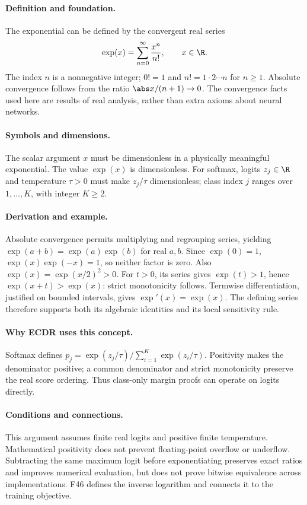 \paragraph{Definition and foundation.}
The exponential can be defined by the convergent real series
\[
 \exp(x)=\sum_{n=0}^{\infty}\frac{x^n}{n!},\qquad x\in\R.
\]
The index $n$ is a nonnegative integer; $0!=1$ and $n!=1\cdot2\cdots n$ for $n\ge1$. Absolute convergence follows from the ratio $\abs x/(n+1)\to0$. The convergence facts used here are results of real analysis, rather than extra axioms about neural networks.
\paragraph{Symbols and dimensions.}
The scalar argument $x$ must be dimensionless in a physically meaningful exponential. The value $\exp(x)$ is dimensionless. For softmax, logits $z_j\in\R$ and temperature $\tau>0$ must make $z_j/\tau$ dimensionless; class index $j$ ranges over $1,\ldots,K$, with integer $K\ge2$.
\paragraph{Derivation and example.}
Absolute convergence permits multiplying and regrouping series, yielding $\exp(a+b)=\exp(a)\exp(b)$ for real $a,b$. Since $\exp(0)=1$, $\exp(x)\exp(-x)=1$, so neither factor is zero. Also $\exp(x)=\exp(x/2)^2>0$. For $t>0$, its series gives $\exp(t)>1$, hence $\exp(x+t)>\exp(x)$: strict monotonicity follows. Termwise differentiation, justified on bounded intervals, gives $\exp'(x)=\exp(x)$. The defining series therefore supports both its algebraic identities and its local sensitivity rule.
\paragraph{Why ECDR uses this concept.}
Softmax defines $p_j=\exp(z_j/\tau)/\sum_{i=1}^{K}\exp(z_i/\tau)$. Positivity makes the denominator positive; a common denominator and strict monotonicity preserve the real score ordering. Thus class-only margin proofs can operate on logits directly.
\paragraph{Conditions and connections.}
This argument assumes finite real logits and positive finite temperature. Mathematical positivity does not prevent floating-point overflow or underflow. Subtracting the same maximum logit before exponentiating preserves exact ratios and improves numerical evaluation, but does not prove bitwise equivalence across implementations. F46 defines the inverse logarithm and connects it to the training objective.

